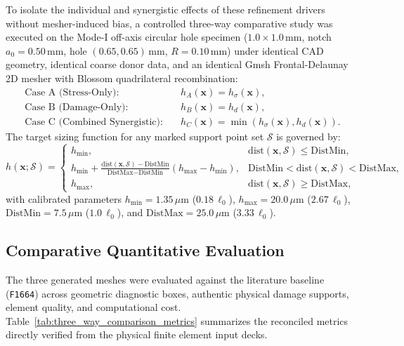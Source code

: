 To isolate the individual and synergistic effects of these refinement drivers without mesher-induced bias, a controlled three-way comparative study was executed on the Mode-I off-axis circular hole specimen ($1.0 \times 1.0\,\mathrm{mm}$, notch $a_0 = 0.50\,\mathrm{mm}$, hole $(0.65, 0.65)\,\mathrm{mm}$, $R = 0.10\,\mathrm{mm}$) under identical CAD geometry, identical coarse donor data, and an identical Gmsh Frontal-Delaunay 2D mesher with Blossom quadrilateral recombination:
\begin{align}
  \text{Case A (Stress-Only):} \quad & h_A(\mathbf{x}) = h_\sigma(\mathbf{x}), \label{eq:case_a_def} \\
  \text{Case B (Damage-Only):} \quad & h_B(\mathbf{x}) = h_d(\mathbf{x}), \label{eq:case_b_def} \\
  \text{Case C (Combined Synergistic):} \quad & h_C(\mathbf{x}) = \min\left( h_\sigma(\mathbf{x}), h_d(\mathbf{x}) \right). \label{eq:case_c_def}
\end{align}
The target sizing function for any marked support point set $\mathcal{S}$ is governed by:
\begin{equation}
  h(\mathbf{x}; \mathcal{S}) = \begin{cases}
    h_{\min}, & \text{dist}(\mathbf{x}, \mathcal{S}) \le \text{DistMin}, \\
    h_{\min} + \frac{\text{dist}(\mathbf{x}, \mathcal{S}) - \text{DistMin}}{\text{DistMax} - \text{DistMin}} (h_{\max} - h_{\min}), & \text{DistMin} < \text{dist}(\mathbf{x}, \mathcal{S}) < \text{DistMax}, \\
    h_{\max}, & \text{dist}(\mathbf{x}, \mathcal{S}) \ge \text{DistMax},
  \end{cases}
  \label{eq:sizing_distance_function}
\end{equation}
with calibrated parameters $h_{\min} = 1.35\,\mu\mathrm{m}$ ($0.18\,\ell_0$), $h_{\max} = 20.0\,\mu\mathrm{m}$ ($2.67\,\ell_0$), $\text{DistMin} = 7.5\,\mu\mathrm{m}$ ($1.0\,\ell_0$), and $\text{DistMax} = 25.0\,\mu\mathrm{m}$ ($3.33\,\ell_0$).

\subsection{Comparative Quantitative Evaluation}
The three generated meshes were evaluated against the literature baseline (\texttt{F1664}) across geometric diagnostic boxes, authentic physical damage supports, element quality, and computational cost. Table~\ref{tab:three_way_comparison_metrics} summarizes the reconciled metrics directly verified from the physical finite element input decks.

